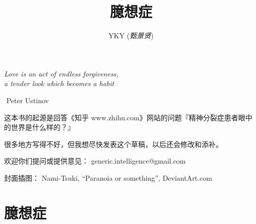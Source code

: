 \documentclass[12pt]{report}
\newcommand{\tab}{\hspace*{1cm}}
\newcommand*\dashh{\textemdash\,\,}
\begin{document}

\cleardoublepage
\title{\Huge{臆想症}}
\author{YKY (\textit{甄景贤})}



\FPsub\resulta{\thedatezero}{\thedateone}
\FPdiv{}
\FPround{}

\FPsub\resultc{\thedatezero}{\thedatetwo}
\FPdiv{}
\FPround{}

\large

\tab\tab\tab \parbox{9cm}{\textit{Love is an act of endless forgiveness,\\
a tender look which becomes a habit}}
\vspace{0.5cm}
\begin{flushright}
\dashh Peter Ustinov \hspace*{3cm}
\end{flushright}

{\let\newpage\relax\maketitle}

\maketitle
\setlength{\parindent}{0em}
\setlength{\parskip}{2.8ex plus0.8ex minus0.8ex}

\small

\begin{framed}
这本书的起源是回答《知乎 www.zhihu.com》网站的问题『精神分裂症患者眼中的世界是什么样的？』

很多地方写得不好，但我想尽快发表这个草稿，以后还会修改和添补。

欢迎你们提问或提供意见： generic.intelligence@gmail.com

封面插图：  Nami-Tsuki, ``Paranoia or something'', DeviantArt.com
\end{framed}
\large

\dominitoc
\tableofcontents

\chapter{臆想症}
\end{document}
